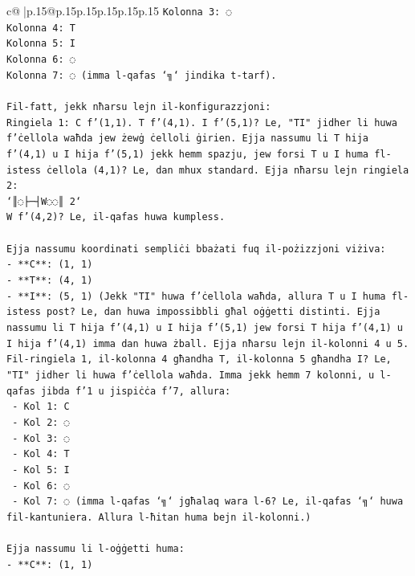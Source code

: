 \documentclass{article}
\begin{document}
{\begin{supertabular}{c@{$\;$}|p{.15\linewidth}@{}p{.15\linewidth}p{.15\linewidth}p{.15\linewidth}p{.15\linewidth}p{.15\linewidth}}
{{{\texttt{Kolonna 3: ◌} \\
\texttt{Kolonna 4: T} \\
\texttt{Kolonna 5: I} \\
\texttt{Kolonna 6: ◌} \\
\texttt{Kolonna 7: ◌ (imma l{-}qafas `╗` jindika t{-}tarf).} \\
\\ 
\texttt{Fil{-}fatt, jekk nħarsu lejn il{-}konfigurazzjoni:} \\
\texttt{Ringiela 1: C f'(1,1). T f'(4,1). I f'(5,1)? Le, "TI" jidher li huwa f'ċellola waħda jew żewġ ċelloli ġirien. Ejja nassumu li T hija f'(4,1) u I hija f'(5,1) jekk hemm spazju, jew forsi T u I huma fl{-}istess ċellola (4,1)? Le, dan mhux standard. Ejja nħarsu lejn ringiela 2:} \\
\texttt{`║◌├─┤W◌◌║ 2`} \\
\texttt{W f'(4,2)? Le, il{-}qafas huwa kumpless.} \\
\\ 
\texttt{Ejja nassumu koordinati sempliċi bbażati fuq il{-}pożizzjoni viżiva:} \\
\texttt{{-} **C**: (1, 1)} \\
\texttt{{-} **T**: (4, 1)} \\
\texttt{{-} **I**: (5, 1) (Jekk "TI" huwa f'ċellola waħda, allura T u I huma fl{-}istess post? Le, dan huwa impossibbli għal oġġetti distinti. Ejja nassumu li T hija f'(4,1) u I hija f'(5,1) jew forsi T hija f'(4,1) u I hija f'(4,1) imma dan huwa żball. Ejja nħarsu lejn il{-}kolonni 4 u 5. Fil{-}ringiela 1, il{-}kolonna 4 għandha T, il{-}kolonna 5 għandha I? Le, "TI" jidher li huwa f'ċellola waħda. Imma jekk hemm 7 kolonni, u l{-}qafas jibda f'1 u jispiċċa f'7, allura:} \\
\texttt{  {-} Kol 1: C} \\
\texttt{  {-} Kol 2: ◌} \\
\texttt{  {-} Kol 3: ◌} \\
\texttt{  {-} Kol 4: T} \\
\texttt{  {-} Kol 5: I} \\
\texttt{  {-} Kol 6: ◌} \\
\texttt{  {-} Kol 7: ◌ (imma l{-}qafas `╗` jgħalaq wara l{-}6? Le, il{-}qafas `╗` huwa fil{-}kantuniera. Allura l{-}ħitan huma bejn il{-}kolonni.)} \\
\\ 
\texttt{Ejja nassumu li l{-}oġġetti huma:} \\
\texttt{{-} **C**: (1, 1)} \\
}}}
\end{supertabular}}
\end{document}
